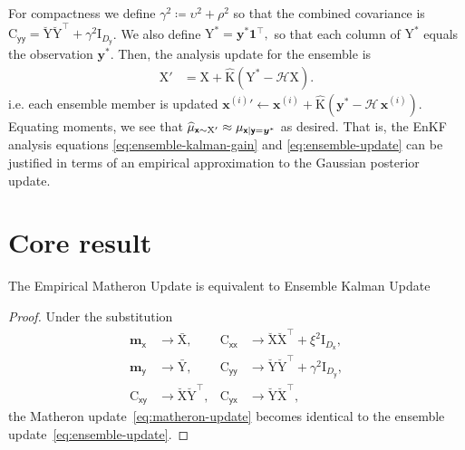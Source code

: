 \documentclass[wcp]{jmlr} %
\newcommand{\vv}[1]{\boldsymbol{#1}}
\newcommand{\mm}[1]{\mathrm{#1}}
\newcommand{\mmmean}[1]{\bar{\mathrm{#1}}}
\newcommand{\mmdev}[1]{\breve{\mathrm{#1}}}
\newcommand{\rv}[1]{\mathsf{#1}}
\newcommand{\vrv}[1]{\vv{\rv{#1}}}
\newcommand{\op}[1]{\mathcal{#1}}
\newcommand{\gvn}{\mid}
\begin{document}
For compactness we define \(\gamma^2 \coloneq \upsilon^2 + \rho^2\) so that the combined covariance is \(\mm{C}_{\vrv{yy}} = \mmdev{Y} \mmdev{Y}^\top + \gamma^2\mm{I}_{D_{\vrv{y}}}\).
We also define
$\mm{Y}^* = \vv{y}^* \mathbf{1}^\top,$
so that each column of \(\mm{Y}^*\) equals the observation \(\vv{y}^*\). Then, the analysis update for the ensemble is
\begin{align}
    \mm{X}' &= \mm{X} + \widehat{\mm{K}} \left(\mm{Y}^* - \op{H}\mm{X}\right).\label{eq:ensemble-update}
\end{align}
i.e. each ensemble member is updated
\(\vv{x}^{(i)}{}' \gets \vv{x}^{(i)} + \widehat{\mm{K}} \left(\vv{y}^* - \op{H}\,\vv{x}^{(i)}\right).\)
Equating moments, we see that
\(\ELaw[\vrv{x}\sim \mm{X}']
\approx \Law[\vrv{x} \gvn \vrv{y}=\vv{y}^*] \) as desired.
That is, the EnKF analysis equations \eqref{eq:ensemble-kalman-gain} and \eqref{eq:ensemble-update} can be justified in terms of an empirical approximation to the Gaussian posterior update.

\section{Core result}
\begin{proposition}
    The Empirical Matheron Update is equivalent to Ensemble Kalman Update
\end{proposition}
\begin{proof}
Under the substitution
\begin{align}
    \vv{m}_{\vrv{x}} &\to \mmmean{X}, & \mm{C}_{\vrv{xx}} &\to \mmdev{X} \mmdev{X}^\top + \xi^2\mm{I}_{D_{\vrv{x}}},\\
    \vv{m}_{\vrv{y}} &\to \mmmean{Y}, & \mm{C}_{\vrv{yy}} &\to \mmdev{Y} \mmdev{Y}^\top + \gamma^2\mm{I}_{D_{\vrv{y}}},\\
    \mm{C}_{\vrv{xy}} &\to \mmdev{X} \mmdev{Y}^\top, & \mm{C}_{\vrv{yx}} &\to \mmdev{Y} \mmdev{X}^\top,
\end{align}
the Matheron update~\eqref{eq:matheron-update} becomes identical to the ensemble update~\eqref{eq:ensemble-update}.
\end{proof}
\end{document}
